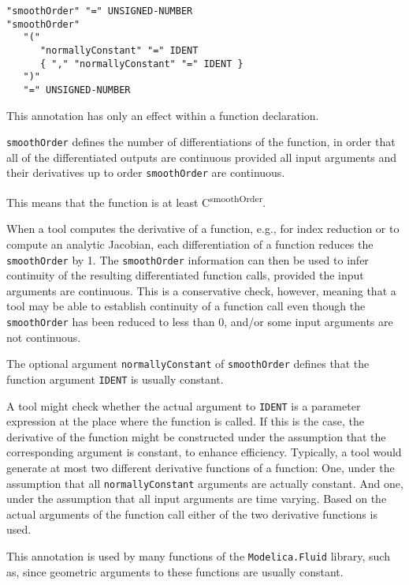 \begin{annotationdefinition}[smoothOrder]
\begin{synopsis}[grammar]\begin{lstlisting}
"smoothOrder" "=" UNSIGNED-NUMBER
"smoothOrder"
   "("
      "normallyConstant" "=" IDENT
      { "," "normallyConstant" "=" IDENT }
   ")"
   "=" UNSIGNED-NUMBER
\end{lstlisting}\end{synopsis}
\begin{semantics}
This annotation has only an effect within a function declaration.

{\lstinline!smoothOrder!} defines the number of differentiations of the function, in order that all of the differentiated outputs are continuous provided all input arguments and their derivatives up to order {\lstinline!smoothOrder!} are continuous.

\begin{nonnormative}
This means that the function is at least C\textsuperscript{smoothOrder}.

When a tool computes the derivative of a function, e.g., for index reduction or to compute an analytic Jacobian, each differentiation of a function reduces the \lstinline!smoothOrder! by 1.
The \lstinline!smoothOrder! information can then be used to infer continuity of the resulting differentiated function calls, provided the input arguments are continuous.
This is a conservative check, however, meaning that a tool may be able to establish continuity of a function call even though the \lstinline!smoothOrder! has been reduced to less than 0, and/or some input arguments are not continuous.
\end{nonnormative}

The optional argument {\lstinline!normallyConstant!} of {\lstinline!smoothOrder!} defines that the function argument {\lstinline!IDENT!} is usually constant.

\begin{nonnormative}
A tool might check whether the actual argument to {\lstinline!IDENT!} is a parameter expression at the place where the function is called.
If this is the case, the derivative of the function might be constructed under the assumption that the corresponding argument is constant, to enhance efficiency.
Typically, a tool would generate at most two different derivative functions of a function:
One, under the assumption that all {\lstinline!normallyConstant!} arguments are actually constant.
And one, under the assumption that all input arguments are time varying.
Based on the actual arguments of the function call either of the two derivative functions is used.

This annotation is used by many functions of the {\lstinline!Modelica.Fluid!} library, such as, since geometric arguments to these functions are usually constant.
\end{nonnormative}
\end{semantics}
\end{annotationdefinition}

